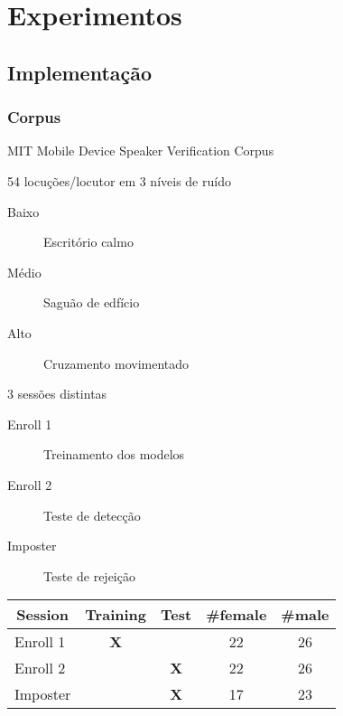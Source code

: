 \section{Experimentos}
\label{sec:experiments}

\contentscurrent

\subsection{Implementação}

\begin{frame}
\frametitle{Corpus}
\begin{description}
    \item[Base] MIT Mobile Device Speaker Verification Corpus
    \pause
    \item 54 locuções/locutor em 3 níveis de ruído
    \pause
    \begin{description}
        \item[Baixo] Escritório calmo
        \pause
        \item[Médio] Saguão de edfício
        \pause
        \item[Alto] Cruzamento movimentado
        \pause
    \end{description}
    \item 3 sessões distintas
    \begin{description}
        \item[Enroll 1] Treinamento dos modelos
        \pause
        \item[Enroll 2] Teste de detecção
        \pause
        \item[Imposter] Teste de rejeição
        \pause
    \end{description}
\end{description}

\begin{table}[h]
    \centering
    \begin{tabular}{|l|c|c|c|c|}
    \hline
    \multicolumn{1}{|c|}{{\bf Session}} & {\bf Training} & {\bf Test} & {\bf \#female} & {\bf \#male} \\ \hline
    Enroll 1 & {\bf X} & {\bf } & 22 & 26 \\ \hline
    Enroll 2 & {\bf } & {\bf X} & 22 & 26 \\ \hline
    Imposter & {\bf } & {\bf X} & 17 & 23 \\ \hline
    \end{tabular}
\end{table}
\end{frame}

